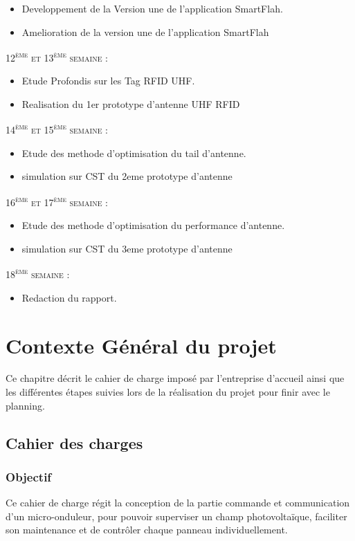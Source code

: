 \documentclass[11pt, a4paper, twoside]{book}
\begin{document}
\begin{itemize}
\item Developpement de la Version une de l'application SmartFlah.
\item Amelioration de la version une de l'application SmartFlah
\end{itemize}
\textsc{12\textsuperscript{ème} et 13\textsuperscript{ème} semaine :}
\begin{itemize}
\item Etude Profondis sur les Tag RFID UHF.
\item Realisation du 1er prototype d'antenne UHF RFID
\end{itemize}
\textsc{14\textsuperscript{ème} et 15\textsuperscript{ème} semaine :}
\begin{itemize}
\item Etude des methode d'optimisation du tail d'antenne.
\item simulation sur CST du 2eme prototype d'antenne
\end{itemize}
\textsc{16\textsuperscript{ème} et 17\textsuperscript{ème} semaine :}
\begin{itemize}
\item Etude des methode d'optimisation du performance d'antenne.
\item simulation sur CST du 3eme prototype d'antenne
\end{itemize}
\textsc{18\textsuperscript{ème} semaine :}
\begin{itemize}
\item Redaction du rapport.
\end{itemize}


\chapter{Contexte Général du projet}
Ce chapitre décrit le cahier de charge imposé par l'entreprise d'accueil ainsi que les différentes étapes suivies lors de la réalisation du projet pour finir avec le planning.
\section{Cahier des charges}
\subsection{Objectif}
Ce cahier de charge régit la conception de la partie commande et communication d’un micro-onduleur, pour pouvoir superviser un champ photovoltaïque, faciliter son maintenance et de contrôler chaque panneau individuellement.
\end{document}
